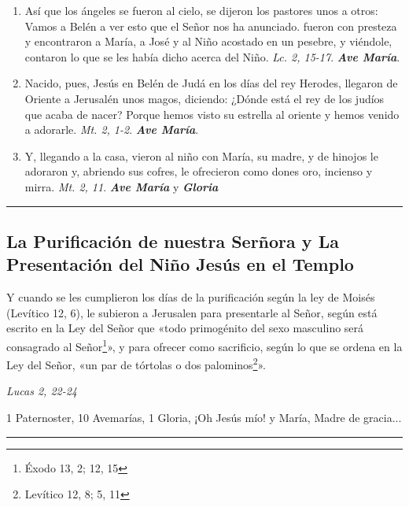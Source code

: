\documentclass[11pt,a4paper]{book}
\begin{document}
\begin{enumerate}
        \item Así que los ángeles se fueron al cielo, se dijeron los pastores unos a otros: Vamos a Belén a ver esto que el Señor nos ha anunciado. fueron
            con presteza y encontraron a María, a José y al Niño acostado en un pesebre, y viéndole, contaron lo que se les había dicho acerca del
            Niño. \emph{Lc. 2, 15-17}. \textbf{\emph{Ave María}}.   

        \item Nacido, pues, Jesús en Belén de Judá en los días del rey Herodes, llegaron de Oriente a Jerusalén unos magos, diciendo: ¿Dónde está el rey de los judíos
            que acaba de nacer? Porque hemos visto su estrella al oriente y hemos venido a adorarle. \emph{Mt. 2, 1-2}. \textbf{\emph{Ave María}}.            
        
        \item Y, llegando a la casa, vieron al niño con María, su madre, y de hinojos le adoraron y, abriendo sus cofres, le ofrecieron como dones oro, incienso y mirra. 
            \emph{Mt. 2, 11}. \textbf{\emph{Ave María}} y \textbf{\emph{Gloria}}
    
    \end{enumerate}    

    \rule{\textwidth}{0.5pt}
    

    \subsection*{La Purificación de nuestra Serñora y La Presentación del Niño Jesús en el Templo}

    Y cuando se les cumplieron los días de la purificación según la ley de Moisés (Levítico 12, 6), 
    le subieron a Jerusalen para presentarle al Señor, según está escrito en la Ley del Señor que «todo primogénito 
    del sexo masculino será consagrado al Señor\footnote{Éxodo 13, 2; 12, 15\label{primogenito}}», y para ofrecer como sacrificio, 
    según lo que se ordena en la Ley del Señor, «un par de tórtolas o dos palominos\footnote{Levítico 12, 8; 5, 11\label{sacrificio}}». 
    \begin{flushright}
        \emph{Lucas 2, 22-24}
    \end{flushright}

    1 Paternoster, 10 Avemarías, 1 Gloria, ¡Oh Jesús mío! y María, Madre de gracia...    

    \rule{\textwidth}{0.5pt}
\end{document}
